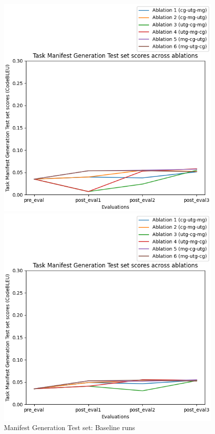 \begin{figure}[H]
    \centering
    \begin{minipage}{0.45\textwidth}
        \centering
        \includegraphics[width=1.1\textwidth]{Figures/results/code_baseline_graphs/task_eval/seed_averaged_task_mg_test_eval_baseline.png} %
        \captionsetup{width=1.1\textwidth}
        \caption{Manifest Generation Test set: Baseline runs}
        \label{MGTestBaseline}
    \end{minipage}\hfill
    \begin{minipage}{0.45\textwidth}
        \centering
        \includegraphics[width=1.1\textwidth]{Figures/results/code_mitigation_graphs/task_eval/seed_averaged_task_mg_test_eval_mitigation.png} %

\end{minipage}
\end{figure}
